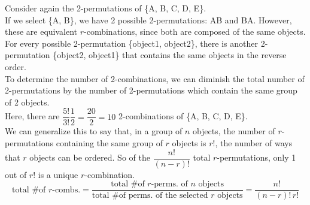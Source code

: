 \documentclass{article}
\begin{document}
Consider again the 2-permutations of \{A, B, C, D, E\}.\\[1ex]
If we select \{A, B\}, we have 2 possible 2-permutations: AB and BA. However, these are equivalent $r$-combinations, since both are composed of the same objects. For every possible 2-permutation \{object1, object2\}, there is another 2-permutation \{object2, object1\} that contains the same objects in the reverse order.\\[1ex]
To determine the number of 2-combinations, we can diminish the total number of 2-permutations by the number of 2-permutations which contain the same group of 2 objects.\\
Here, there are $\dfrac{5!}{3!}\dfrac{1}{2}=\dfrac{20}{2}=10$ 2-combinations of \{A, B, C, D, E\}.\\[1em]
We can generalize this to say that, in a group of $n$ objects, the number of $r$-permutations containing the same group of $r$ objects is $r!$, the number of ways that $r$ objects can be ordered. So of the $\dfrac{n!}{(n-r)!}$ total $r$-permutations, only 1 out of $r!$ is a unique $r$-combination.
\begin{equation*}
\text{total \# of }r\text{-combs.}=\dfrac{\text{total \# of }r\text{-perms. of }n\text{ objects}}{\text{total \# of perms. of the selected }r\text{ objects}}=\dfrac{n!}{(n-r)!\,r!}
\end{equation*}
\end{document}
